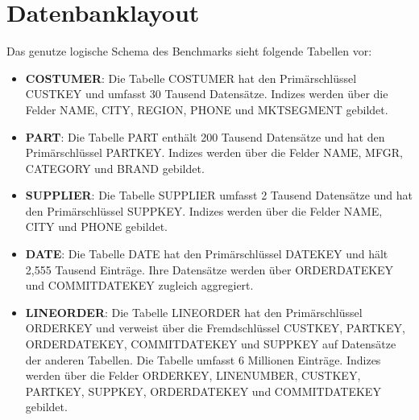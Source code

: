 \newpage

\section{Datenbanklayout}


Das genutze logische Schema des Benchmarks sieht folgende Tabellen vor: 
\begin{itemize}
	\item \textbf{{\glqq}COSTUMER{\grqq}}: Die Tabelle {\glqq}COSTUMER{\grqq} hat den Primärschlüssel {\glqq}CUSTKEY{\grqq} und umfasst 30 Tausend Datensätze. Indizes werden über die Felder {\glqq}NAME{\grqq}, {\glqq}CITY{\grqq}, {\glqq}REGION{\grqq}, {\glqq}PHONE{\grqq} und {\glqq}MKTSEGMENT{\grqq} gebildet. 
	\item \textbf{{\glqq}PART{\grqq}}: Die Tabelle {\glqq}PART{\grqq} enthält 200 Tausend Datensätze und hat den Primärschlüssel {\glqq}PARTKEY{\grqq}. Indizes werden über die Felder {\glqq}NAME{\grqq}, {\glqq}MFGR{\grqq}, {\glqq}CATEGORY{\grqq} und {\glqq}BRAND{\grqq} gebildet. 
	\item \textbf{{\glqq}SUPPLIER{\grqq}}: Die Tabelle {\glqq}SUPPLIER{\grqq} umfasst 2 Tausend Datensätze und hat den Primärschlüssel {\glqq}SUPPKEY{\grqq}. Indizes werden über die Felder {\glqq}NAME{\grqq}, {\glqq}CITY{\grqq} und {\glqq}PHONE{\grqq} gebildet. 
	\item \textbf{{\glqq}DATE{\grqq}}: Die Tabelle {\glqq}DATE{\grqq} hat den Primärschlüssel {\glqq}DATEKEY{\grqq} und hält 2,555 Tausend Einträge. Ihre Datensätze werden über {\glqq}ORDERDATEKEY{\grqq} und {\glqq}COMMITDATEKEY{\grqq} zugleich aggregiert. 
	\item \textbf{{\glqq}LINEORDER{\grqq}}: Die Tabelle {\glqq}LINEORDER{\grqq} hat den Primärschlüssel {\glqq}ORDERKEY{\grqq} und verweist über die Fremdschlüssel {\glqq}CUSTKEY{\grqq}, {\glqq}PARTKEY{\grqq}, {\glqq}ORDERDATEKEY{\grqq}, {\glqq}COMMITDATEKEY{\grqq} und {\glqq}SUPPKEY{\grqq} auf Datensätze der anderen Tabellen. Die Tabelle umfasst 6 Millionen Einträge. Indizes werden über die Felder {\glqq}ORDERKEY, {\glqq}LINENUMBER, {\glqq}CUSTKEY{\grqq}, {\glqq}PARTKEY{\grqq}, {\glqq}SUPPKEY{\grqq}, {\glqq}ORDERDATEKEY{\grqq} und {\glqq}COMMITDATEKEY{\grqq} gebildet. 
\end{itemize}







